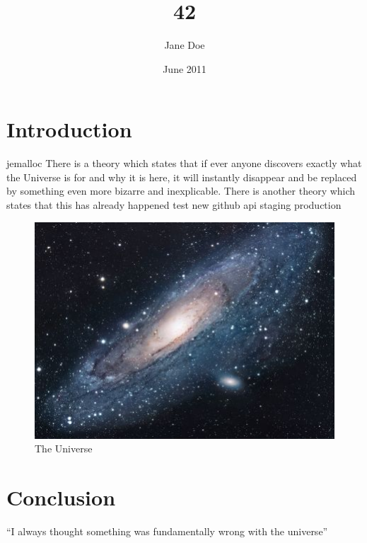 \documentclass{article}
\title{42}
\author{Jane Doe}
\date{June 2011}
\begin{document}
\maketitle

\section{Introduction}

jemalloc
There is a theory which states that if ever anyone discovers exactly what
 the Universe is for and why it is here, 
it will instantly disappear and be replaced by something even more bizarre 
and inexplicable.
There is another theory which states that this has already happened
test new github api
staging production
\begin{figure}[h!]
\centering
\includegraphics[scale=1.7]{universe.jpg}
\caption{The Universe}
\label{threadsVsSync}
\end{figure}

\section{Conclusion}
``I always thought something was fundamentally wrong with the universe'' \citep{adams1995hitchhiker}



\end{document}
